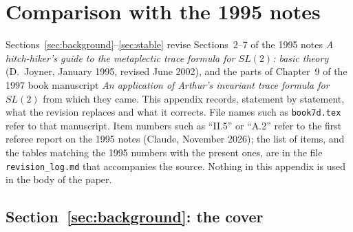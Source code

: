 %

\section{Comparison with the 1995 notes}\label{sec:appendix-1995}

Sections~\ref{sec:background}--\ref{sec:stable} revise Sections~2--7
of the 1995 notes \emph{A hitch-hiker's guide to the metaplectic trace
formula for $SL(2)$: basic theory} (D.~Joyner, January 1995, revised June
2002), and the parts of Chapter~9 of the 1997 book manuscript \emph{An
application of Arthur's invariant trace formula for $SL(2)$} from which
they came. This appendix records, statement by statement, what the
revision replaces and what it corrects. File names such as
\texttt{book7d.tex} refer to that manuscript. Item numbers such as
``II.5'' or ``A.2'' refer to the first referee report on the 1995 notes
(Claude, November 2026); the list of items, and the tables matching the
1995 numbers with the present ones, are in the file
\texttt{revision\_log.md} that accompanies the source. Nothing in this
appendix is used in the body of the paper.


\subsection{Section~\ref{sec:background}: the cover}


